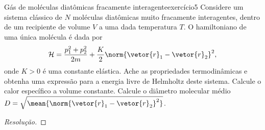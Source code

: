 \begin{exercício}{Gás de moléculas diatômicas fracamente interagente}{exercício5}
    Considere um sistema clássico de \(N\) moléculas diatômicas muito fracamente interagentes, dentro de um recipiente de volume \(V\) a uma dada temperatura \(T\). O hamiltoniano de uma única molécula é dada por
    \begin{equation*}
        \mathcal{H} = \frac{p_1^2 + p_2^2}{2m} + \frac{K}{2}\norm{\vetor{r}_1 - \vetor{r}_2}^2,
    \end{equation*}
    onde \(K > 0\) é uma constante elástica. Ache as propriedades termodinâmicas e obtenha uma expressão para a energia livre de Helmholtz deste sistema. Calcule o calor específico a volume constante. Calcule o diâmetro molecular médio \(D = \sqrt{\mean{\norm{\vetor{r}_1 - \vetor{r}_2}^2}}\).
\end{exercício}
\begin{proof}[Resolução]

\end{proof}
